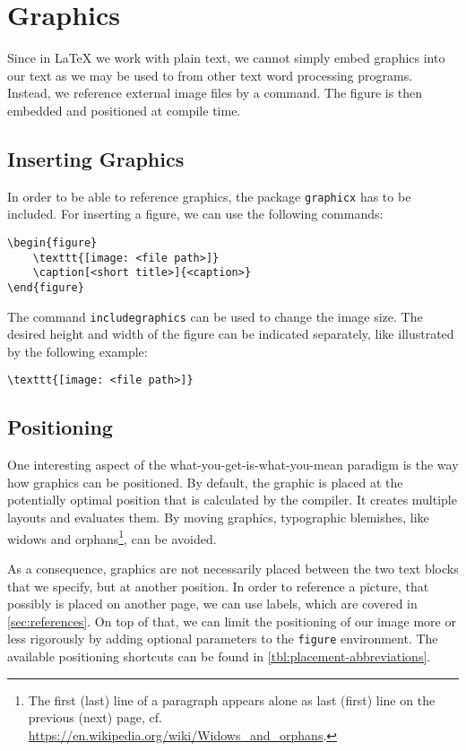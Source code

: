 \chapter{Graphics}
\label{sec:graphics}

Since in \LaTeX{} we work with plain text, we cannot simply embed graphics into our text as we may be used to from other text word processing programs. 
Instead, we reference external image files by a command. The figure is then embedded and positioned at compile time.

\section{Inserting Graphics}
\label{sec:display-graphics}
In order to be able to reference graphics, the package \texttt{graphicx} has to be included. For inserting a figure, we can use the following commands:
	
\begin{verbatim}
\begin{figure}
	\texttt{[image: <file path>]}
	\caption[<short title>]{<caption>}
\end{figure}
\end{verbatim}

\noindent The command \texttt{includegraphics} can be used to change the image size. The desired height and width of the figure can be indicated separately, like illustrated by the following example:

\begin{verbatim}
\texttt{[image: <file path>]}
\end{verbatim}

\section{Positioning}
\label{sec:graphics-placement}
One interesting aspect of the  what-you-get-is-what-you-mean paradigm is the way how graphics can be positioned. 
By default, the graphic is placed at the potentially optimal position that is calculated by the compiler. It creates multiple layouts and evaluates them. By moving graphics, typographic blemishes, like widows and orphans\footnote{The first (last) line of a paragraph appears alone as last (first) line on the previous (next) page, cf. \url{https://en.wikipedia.org/wiki/Widows_and_orphans}.}, can be avoided. 

As a consequence, graphics are not necessarily placed between the two text blocks that we specify, but at another position. 
In order to reference a picture, that possibly is placed on another page, we can use labels, which are covered in \cref{sec:references}. 
On top of that, we can limit the positioning of our image more or less rigorously by adding optional parameters to the \texttt{figure} environment. The available positioning shortcuts can be found in \cref{tbl:placement-abbreviations}.

